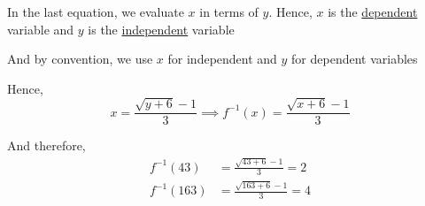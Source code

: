 \documentclass[14pt,fleqn]{extarticle}
\begin{document}
\begin{question}
\begin{step}
In the last equation, we evaluate $x$ in terms of $y$. Hence, $x$ is the \underline{dependent} variable and $y$ is the \underline{independent} variable\newline 

And by convention, we use $x$ for independent and $y$ for dependent variables\newline 

Hence, 
\[ x = \frac{\sqrt{y+6}-1}{3} \implies f^{-1}(x) = \frac{\sqrt{x+6}-1}{3} \]

And therefore, 
\begin{align}
f^{-1}(43) &= \frac{\sqrt{43+6}-1}{3} = 2 \\[5pt]
f^{-1}(163) &= \frac{\sqrt{163+6}-1}{3} = 4 
\end{align}
\end{step}
\end{question} 
\end{document}
